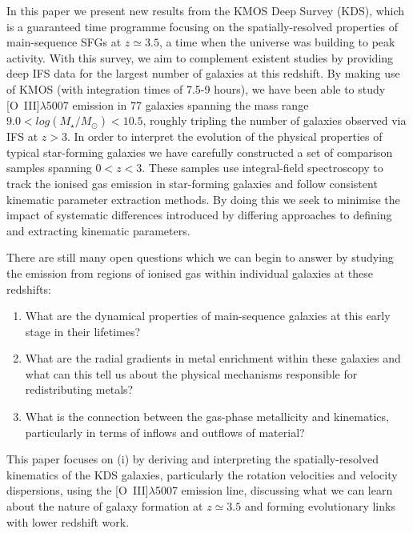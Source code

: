 \documentclass[fleqn,usenatbib]{mnras}
\begin{document}
\noindent
In this paper we present new results from the KMOS Deep Survey (KDS), which is a guaranteed time programme focusing on the spatially-resolved properties of main-sequence SFGs at $z\simeq3.5$, a time when the universe was building to peak activity.
With this survey, we aim to complement existent studies by providing deep IFS data for the largest number of galaxies at this redshift.
By making use of KMOS (with integration times of 7.5-9 hours), we have been able to study [O~{\sc III}]$\lambda$5007 emission in 77 galaxies spanning the mass range $9.0 < log(M_{\star}/M_{\odot}) < 10.5$, roughly tripling the number of galaxies observed via IFS at $z > 3$.
In order to interpret the evolution of the physical properties of typical star-forming galaxies we have carefully constructed a set of comparison samples spanning $0 < z < 3$.
These samples use integral-field spectroscopy to track the ionised gas emission in star-forming galaxies and follow consistent kinematic parameter extraction methods.  
By doing this we seek to minimise the impact of systematic differences introduced by differing approaches to defining and extracting kinematic parameters.

There are still many open questions which we can begin to answer by studying the emission from regions of ionised gas within individual galaxies at these redshifts: 
\begin{enumerate}[label=(\roman*),align=left]
\item What are the dynamical properties of main-sequence galaxies at this early stage in their lifetimes?
\item  What are the radial gradients in metal enrichment within these galaxies and what can this tell us about the physical mechanisms responsible for redistributing metals?
\item What is the connection between the gas-phase metallicity and  kinematics, particularly in terms of inflows and outflows of material?
\end{enumerate}

This paper focuses on (i) by deriving and interpreting the spatially-resolved kinematics of the KDS galaxies, particularly the rotation velocities and velocity dispersions, using the [O~{\sc III}]$\lambda$5007 emission line, discussing what we can learn about the nature of galaxy formation at $z\simeq3.5$ and forming evolutionary links with lower redshift work. \\
\end{document}
